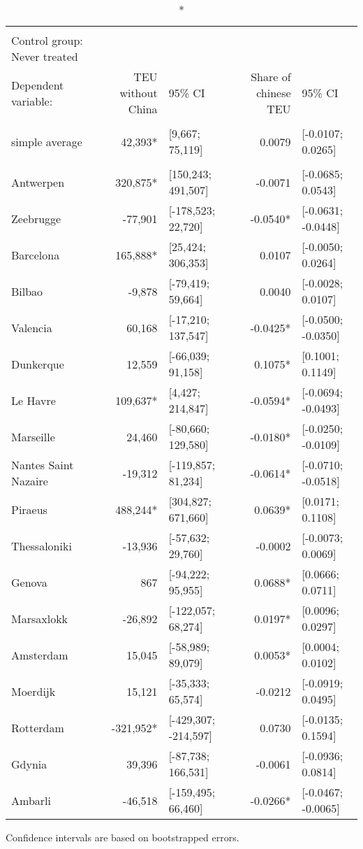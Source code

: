 \setlength{\LTpost}{0mm}
\begin{longtable}{l|rlrl}
\caption*{
{\large Aggregated average treatment effects on container throughput from different origins} \\ 
{\small Control group: Never treated}
} \\ 
\toprule
\multicolumn{1}{l}{Dependent variable:} & TEU without China & 95\% CI & Share of chinese TEU & 95\% CI \\ 
\midrule\addlinespace[2.5pt]
\multicolumn{5}{l}{\vspace*{-5mm}} \\ 
\midrule\addlinespace[2.5pt]
simple average &   42,393* & [9,667; 75,119] &  0.0079 & [-0.0107; 0.0265] \\ 
\midrule\addlinespace[2.5pt]
\multicolumn{5}{l}{by group:} \\ 
\midrule\addlinespace[2.5pt]
Antwerpen &  320,875* & [150,243; 491,507] & -0.0071 & [-0.0685; 0.0543] \\ 
Zeebrugge &  -77,901 & [-178,523; 22,720] & -0.0540* & [-0.0631; -0.0448] \\ 
Barcelona &  165,888* & [25,424; 306,353] &  0.0107 & [-0.0050; 0.0264] \\ 
Bilbao &   -9,878 & [-79,419; 59,664] &  0.0040 & [-0.0028; 0.0107] \\ 
Valencia &   60,168 & [-17,210; 137,547] & -0.0425* & [-0.0500; -0.0350] \\ 
Dunkerque &   12,559 & [-66,039; 91,158] &  0.1075* & [0.1001; 0.1149] \\ 
Le Havre &  109,637* & [4,427; 214,847] & -0.0594* & [-0.0694; -0.0493] \\ 
Marseille &   24,460 & [-80,660; 129,580] & -0.0180* & [-0.0250; -0.0109] \\ 
Nantes Saint Nazaire &  -19,312 & [-119,857; 81,234] & -0.0614* & [-0.0710; -0.0518] \\ 
Piraeus &  488,244* & [304,827; 671,660] &  0.0639* & [0.0171; 0.1108] \\ 
Thessaloniki &  -13,936 & [-57,632; 29,760] & -0.0002 & [-0.0073; 0.0069] \\ 
Genova &      867 & [-94,222; 95,955] &  0.0688* & [0.0666; 0.0711] \\ 
Marsaxlokk &  -26,892 & [-122,057; 68,274] &  0.0197* & [0.0096; 0.0297] \\ 
Amsterdam &   15,045 & [-58,989; 89,079] &  0.0053* & [0.0004; 0.0102] \\ 
Moerdijk &   15,121 & [-35,333; 65,574] & -0.0212 & [-0.0919; 0.0495] \\ 
Rotterdam & -321,952* & [-429,307; -214,597] &  0.0730 & [-0.0135; 0.1594] \\ 
Gdynia &   39,396 & [-87,738; 166,531] & -0.0061 & [-0.0936; 0.0814] \\ 
Ambarli &  -46,518 & [-159,495; 66,460] & -0.0266* & [-0.0467; -0.0065] \\ 
\bottomrule
\end{longtable}
\begin{minipage}{\linewidth}
Confidence intervals are based on bootstrapped errors. \\
\end{minipage}

